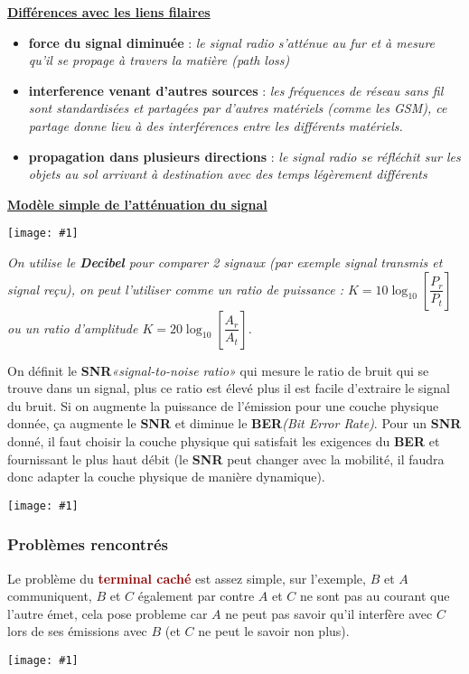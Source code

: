 \documentclass{article}
\newcommand{\dred}[1]{\textcolor{darkred}{\textbf{#1}}}
\newcommand{\imgR}[2]{\begin{center}\texttt{[image: \#1]}\end{center}}
\newcommand{\bfp}[2]{\item \textbf{#1} : \textit{#2}}
\newcommand{\stitre}[1]{\noindent\textbf{\underline{#1}} \\}
\begin{document}
\stitre{Différences avec les liens filaires}
\begin{itemize}
\bfp{force du signal diminuée}{le signal radio s'atténue au fur et à mesure qu'il se propage à travers la 
matière \textit{(path loss)}}
\bfp{interference venant d'autres sources}{les fréquences de réseau sans fil sont standardisées et partagées par 
d'autres matériels (comme les GSM), ce partage donne lieu à des interférences entre les différents matériels.}
\bfp{propagation dans plusieurs directions}{le signal radio se réfléchit sur les objets au sol arrivant à 
destination avec des temps légèrement différents} \\
\end{itemize}

\stitre{Modèle simple de l'atténuation du signal}

\imgR{CN_144.png}{400}

\noindent\textit{On utilise le \textbf{Decibel} pour comparer 2 signaux (par exemple signal transmis et signal
reçu), on peut l'utiliser comme un ratio de puissance : $K = 10\log_{10}\left[\dfrac{P_r}{P_t}\right]$ ou un 
ratio d'amplitude $K = 20\log_{10}\left[\dfrac{A_r}{A_t}\right]$.} \\

\begin{multicols}{2}
\noindent On définit le \textbf{SNR}\textit{«signal-to-noise ratio»} qui mesure le ratio de bruit qui se trouve 
dans un signal, plus ce ratio est élevé plus il est facile d'extraire le signal du bruit. Si on augmente la 
puissance de l'émission pour une couche physique donnée, ça augmente le \textbf{SNR} et diminue le 
\textbf{BER}\textit{(Bit Error Rate)}. Pour un \textbf{SNR} donné, il faut choisir la couche physique qui 
satisfait les exigences du \textbf{BER} et fournissant le plus haut débit (le \textbf{SNR} peut changer avec la 
mobilité, il faudra donc adapter la couche physique de manière dynamique).
\imgR{CN_145.png}{200}
\end{multicols}

\subsubsection{Problèmes rencontrés}

\begin{multicols}{2}
Le problème du \dred{terminal caché} est assez simple, sur l'exemple, $B$ et $A$ communiquent, $B$ et $C$ 
également par contre $A$ et $C$ ne sont pas au courant que l'autre émet, cela pose probleme car $A$ ne peut pas 
savoir qu'il interfère avec $C$ lors de ses émissions avec $B$ (et $C$ ne peut le savoir non plus).
\imgR{CN_146.png}{125}
\end{multicols}
\end{document}
